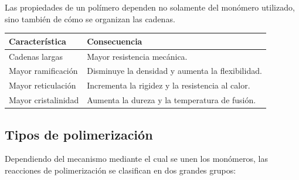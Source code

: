 Las propiedades de un polímero dependen no solamente del monómero utilizado, sino
también de cómo se organizan las cadenas.

\begin{center}

\begin{tabular}{p{4cm}p{8.2cm}}

\toprule

\textbf{Característica} & \textbf{Consecuencia} \\

\midrule

Cadenas largas &
Mayor resistencia mecánica. \\

\addlinespace

Mayor ramificación &
Disminuye la densidad y aumenta la flexibilidad. \\

\addlinespace

Mayor reticulación &
Incrementa la rigidez y la resistencia al calor. \\

\addlinespace

Mayor cristalinidad &
Aumenta la dureza y la temperatura de fusión. \\

\bottomrule

\end{tabular}

\end{center}


\subsection{Tipos de polimerización}

Dependiendo del mecanismo mediante el cual se unen los monómeros, las reacciones de
polimerización se clasifican en dos grandes grupos:

\begin{center}


\end{center}

